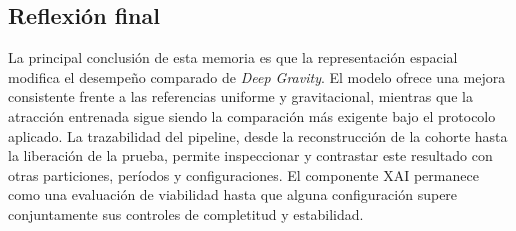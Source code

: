 \subsection{Reflexión final}

La principal conclusión de esta memoria es que la representación espacial modifica el desempeño comparado de \textit{Deep Gravity}. El modelo ofrece una mejora consistente frente a las referencias uniforme y gravitacional, mientras que la atracción entrenada sigue siendo la comparación más exigente bajo el protocolo aplicado. La trazabilidad del pipeline, desde la reconstrucción de la cohorte hasta la liberación de la prueba, permite inspeccionar y contrastar este resultado con otras particiones, períodos y configuraciones. El componente XAI permanece como una evaluación de viabilidad hasta que alguna configuración supere conjuntamente sus controles de completitud y estabilidad.

